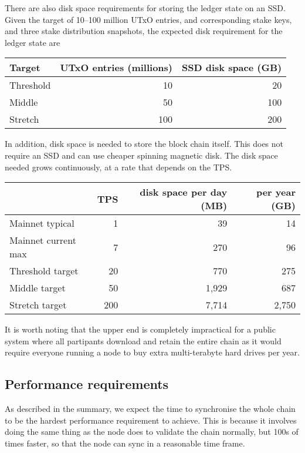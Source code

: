 \documentclass[11pt,a4paper]{article}
\begin{document}
There are also disk space requirements for storing the ledger state on an SSD.
Given the target of 10--100 million UTxO entries, and corresponding stake keys,
and three stake distribution snapshots, the expected disk requirement for the
ledger state are
\begin{center}
\begin{tabular}[]{lrr}
  Target  & UTxO entries (millions) & SSD disk space (GB) \\
  \toprule
  Threshold &  10  &  20 \\
  Middle    &  50  & 100 \\
  Stretch   & 100  & 200
\end{tabular}
\end{center}
In addition, disk space is needed to store the block chain itself. This does
not require an SSD and can use cheaper spinning magnetic disk. The disk space
needed grows continuously, at a rate that depends on the TPS.
\begin{center}
\begin{tabular}[]{lrrr}
                      & TPS & disk space per day (MB) & per year (GB) \\
  \toprule
  Mainnet typical     &   1 &    39 &    14 \\
  Mainnet current max &   7 &   270 &    96 \\
  Threshold target    &  20 &   770 &   275 \\
  Middle target       &  50 & 1,929 &   687 \\
  Stretch target      & 200 & 7,714 & 2,750
\end{tabular}
\end{center}
It is worth noting that the upper end is completely impractical for a public
system where all partipants download and retain the entire chain as it would
require everyone running a node to buy extra multi-terabyte hard drives per
year.

\subsection{Performance requirements}
\label{performance-requirements}

As described in the summary, we expect the time to synchronise the whole chain
to be the hardest performance requirement to achieve. This is because it
involves doing the same thing as the node does to validate the chain normally,
but 100s of times faster, so that the node can sync in a reasonable time frame.
\end{document}
